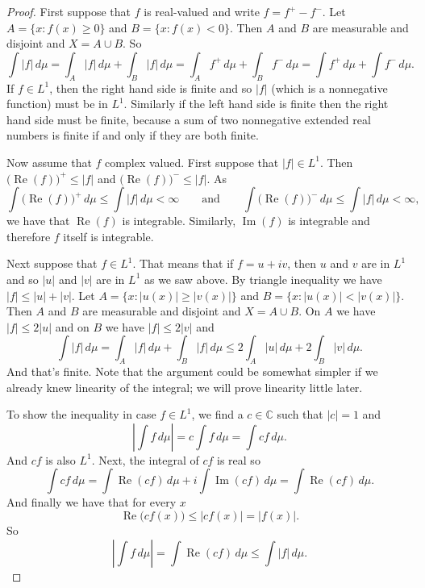 \documentclass[12pt]{book}
\renewcommand{\Re}{\operatorname{Re}}
\renewcommand{\Im}{\operatorname{Im}}
\newcommand{\abs}[1]{\left\lvert {#1} \right\rvert}
\newcommand{\C}{{\mathbb{C}}}
\theoremstyle{plain}
\theoremstyle{remark}
\theoremstyle{definition}
\theoremstyle{exercise}
\theoremstyle{example}
\begin{document}
\begin{proof}
First suppose that $f$ is real-valued and write
$f = f^+ - f^-$.
Let $A = \{ x : f(x) \geq 0 \}$ and
$B = \{ x : f(x) < 0 \}$.  Then $A$ and $B$ are measurable and disjoint and
$X = A \cup B$.  So
$$
\int \abs{f} \, d\mu = 
\int_A \abs{f} \, d\mu +
\int_B \abs{f} \, d\mu
=
\int_A f^+ \, d\mu +
\int_B f^- \, d\mu
=
\int f^+ \, d\mu +
\int f^- \, d\mu .
$$
If $f \in L^1$, then the right hand side is finite and so $\abs{f}$ (which
is a nonnegative function) must be in $L^1$.  Similarly if the left hand
side is finite then the right hand side must be finite, because a sum of two
nonnegative extended real numbers is finite if and only if they are both
finite.

Now assume that $f$ complex valued.
First suppose that $\abs{f} \in L^1$.  Then
$\bigl(\Re(f)\bigr)^+ \leq \abs{f}$ and
$\bigl(\Re(f)\bigr)^- \leq \abs{f}$.  As
$$
\int \bigl(\Re(f)\bigr)^+ \, d\mu \leq
\int \abs{f} \, d\mu < \infty
\qquad \text{and} \qquad
\int \bigl(\Re(f)\bigr)^- \, d\mu \leq
\int \abs{f} \, d\mu < \infty ,
$$
we have that
$\Re(f)$ is integrable.  Similarly, $\Im(f)$ is
integrable and therefore $f$ itself is integrable.

Next suppose that $f \in L^1$.  That means that if $f=u+iv$, then
$u$ and $v$ are in $L^1$ and so
$\abs{u}$ and $\abs{v}$ are in $L^1$ as we saw above.  By triangle inequality we have
$\abs{f} \leq \abs{u}+\abs{v}$.  Let $A = \{ x : \abs{u(x)} \geq \abs{v(x)}  \}$ and
$B = \{ x : \abs{u(x)} < \abs{v(x)} \}$.
Then $A$ and $B$ are measurable and disjoint and
$X = A \cup B$.  On $A$ we have $\abs{f} \leq 2\abs{u}$ and on $B$ we have
$\abs{f} \leq 2\abs{v}$ and
$$
\int \abs{f} \, d\mu = 
\int_A \abs{f} \, d\mu +
\int_B \abs{f} \, d\mu
\leq
2 \int_A \abs{u} \, d\mu +
2 \int_B \abs{v} \, d\mu .
$$
And that's finite.  Note that the argument could be somewhat simpler if we
already knew linearity of the integral; we will prove linearity little later.

To show the inequality in case $f \in L^1$, we find
a $c \in \C$ such that
$\abs{c}=1$ and
$$
\abs{\int f \, d\mu} = 
c \int f \, d\mu =
\int cf \, d\mu .
$$
And $cf$ is also $L^1$.
Next, the integral of $cf$ is real so
$$
\int cf \, d\mu =
\int \Re(cf) \, d\mu + i \int \Im(cf) \, d\mu
=
\int \Re(cf) \, d\mu .
$$
And finally we have that for every $x$
$$
\Re\bigl(cf(x)\bigr) \leq \abs{cf(x)} = \abs{f(x)} . 
$$
So
$$
\abs{\int f \, d\mu} = 
\int \Re(cf) \, d\mu  \leq
\int \abs{f} \, d\mu .
$$
\end{proof}
\end{document}
